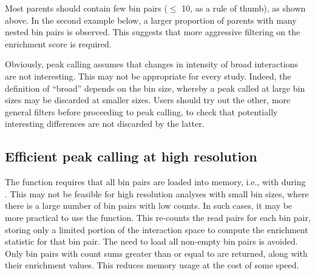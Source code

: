 \documentclass{report}\usepackage[]{graphicx}\usepackage[usenames,dvipsnames]{color}
\newcommand{\hlnum}[1]{\textcolor[rgb]{0.816,0.125,0.439}{#1}}%
\newcommand{\hlstr}[1]{\textcolor[rgb]{0.251,0.627,0.251}{#1}}%
\newcommand{\hlcom}[1]{\textcolor[rgb]{0.502,0.502,0.502}{\textit{#1}}}%
\newcommand{\hlopt}[1]{\textcolor[rgb]{0,0,0}{#1}}%
\newcommand{\hlstd}[1]{\textcolor[rgb]{0.251,0.251,0.251}{#1}}%
\newcommand{\hlkwb}[1]{\textcolor[rgb]{0,0,0}{#1}}%
\newcommand{\hlkwc}[1]{\textcolor[rgb]{0.251,0.251,0.251}{#1}}%
\newcommand{\hlkwd}[1]{\textcolor[rgb]{0.878,0.439,0.125}{#1}}%
\newenvironment{knitrout}{}{} %
\begin{document}
Most parents should contain few bin pairs ($\le$ 10, as a rule of thumb), as shown above.
In the second example below, a larger proportion of parents with many nested bin pairs is observed.
This suggests that more aggressive filtering on the enrichment score is required.

\begin{knitrout}
\color{fgcolor}
\end{knitrout}

Obviously, peak calling assumes that changes in intensity of broad interactions are not interesting.
This may not be appropriate for every study.
Indeed, the definition of ``broad'' depends on the bin size, whereby a peak called at large bin sizes may be discarded at smaller sizes.
Users should try out the other, more general filters before proceeding to peak calling, to check that potentially interesting differences are not discarded by the latter.

\subsection{Efficient peak calling at high resolution}
The  function requires that all bin pairs are loaded into memory, i.e., with  during .
This may not be feasible for high resolution analyses with small bin sizes, where there is a large number of bin pairs with low counts.
In such cases, it may be more practical to use the  function.
This re-counts the read pairs for each bin pair, storing only a limited portion of the interaction space to compute the enrichment statistic for that bin pair.
The need to load all non-empty bin pairs is avoided.
Only bin pairs with count sums greater than or equal to  are returned, along with their enrichment values.
This reduces memory usage at the cost of some speed.
\end{document}
